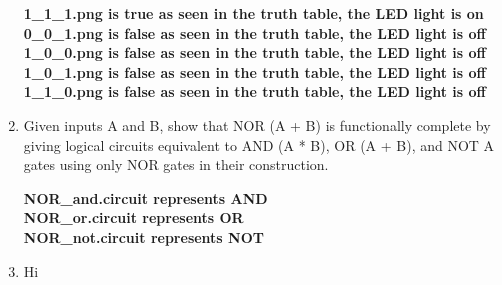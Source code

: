 \documentclass{article}
\begin{document}
\begin{enumerate}
\begin{center}
            \textbf{1\_1\_1.png is true as seen in the truth table, the LED light is on}\\
            \textbf{0\_0\_1.png is false as seen in the truth table, the LED light is off}\\
            \textbf{1\_0\_0.png is false as seen in the truth table, the LED light is off}\\
            \textbf{1\_0\_1.png is false as seen in the truth table, the LED light is off}\\
            \textbf{1\_1\_0.png is false as seen in the truth table, the LED light is off}\\
        \end{center}
        \item Given inputs A and B, show that NOR {(A + B)} is functionally complete by giving logical
        circuits equivalent to AND {(A * B)}, OR {(A + B)}, and NOT {A} gates using only NOR
        gates in their construction.
        \begin{center}
            \textbf{NOR\_and.circuit represents AND}\\
            \textbf{NOR\_or.circuit represents OR}\\
            \textbf{NOR\_not.circuit represents NOT}
        \end{center}
        \item Hi
    \end{enumerate}
\end{document}

